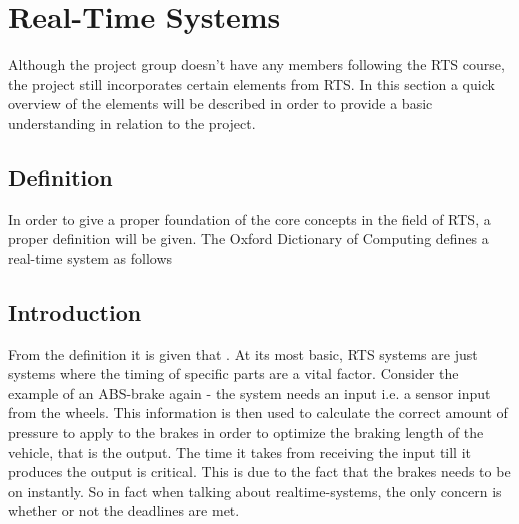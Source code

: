 \section{Real-Time Systems}
Although the project group doesn't have any members following the RTS course,
the project still incorporates certain elements from RTS. In this section a
quick overview of the elements will be described in order to provide a basic
understanding in relation to the project.

\subsection{Definition}
In order to give a proper foundation of the core concepts in the field of RTS, a
proper definition will be given.
The Oxford Dictionary of Computing \citep{daintith2008dictionary} defines a
real-time system as follows 

\subsection{Introduction}
From the definition it is given that . At its most basic, RTS systems are
just systems where the timing of specific parts are a vital factor. Consider
the example of an ABS-brake again - the system needs an input i.e. a sensor
input from the wheels. This information is then used to calculate the correct
amount of pressure to apply to the brakes in order to optimize  the braking
length of the vehicle, that is the output. The time it takes from receiving 
the input till it produces the output is critical. This is due to the fact that
the brakes needs to be on instantly. So in fact when talking about
realtime-systems, the only concern is whether or not the deadlines are met.

